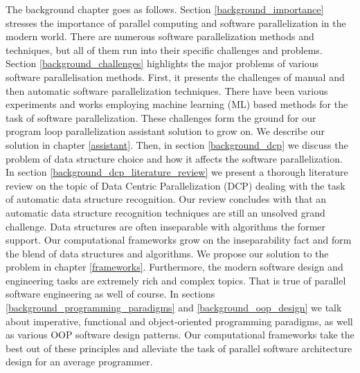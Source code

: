 %
% 
%
\quad The background chapter goes as follows. Section \ref{background_importance} stresses the importance of parallel computing and software parallelization in the modern world. There are numerous software parallelization methods and techniques, but all of them run into their specific challenges and problems. Section \ref{background_challenges} highlights the major problems of various software parallelisation methods. First, it presents the challenges of manual and then automatic software parallelization techniques. There have been various experiments and works employing machine learning (ML) based methods for the task of software parallelization. These challenges form the ground for our program loop parallelization assistant solution to grow on. We describe our solution in chapter \ref{assistant}. Then, in section \ref{background_dcp} we discuss the problem of data structure choice and how it affects the software parallelization. In section \ref{background_dcp_literature_review} we present a thorough literature review on the topic of Data Centric Parallelization (DCP) dealing with the task of automatic data structure recognition. Our review concludes with that an automatic data structure recognition techniques are still an unsolved grand challenge. Data structures are often inseparable with algorithms the former support. Our computational frameworks grow on the inseparability fact and form the blend of data structures and algorithms. We propose our solution to the problem in chapter \ref{frameworks}. Furthermore, the modern software design and engineering tasks are extremely rich and complex topics. That is true of parallel software engineering as well of course. In sections \ref{background_programming_paradigms} and \ref{background_oop_design} we talk about imperative, functional and object-oriented programming paradigms, as well as various OOP software design patterns. Our computational frameworks take the best out of these principles and alleviate the task of parallel software architecture design for an average programmer.

